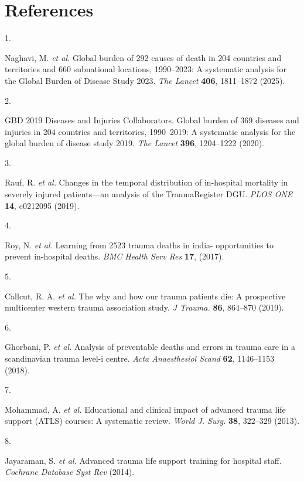\documentclass[
]{scrartcl}
\newlength{\cslhangindent}
\newlength{\csllabelwidth}
\newenvironment{CSLReferences}[2] %
 {\begin{list}{}{%
  \setlength{\itemindent}{0pt}
  \setlength{\leftmargin}{0pt}
  \setlength{\parsep}{0pt}
  \ifodd #1
   \setlength{\leftmargin}{\cslhangindent}
   \setlength{\itemindent}{-1\cslhangindent}
  \fi
  \setlength{\itemsep}{#2\baselineskip}}}
 {\end{list}}
\newcommand{\CSLLeftMargin}[1]{\parbox[t]{\csllabelwidth}{\strut#1\strut}}
\newcommand{\CSLRightInline}[1]{\parbox[t]{\linewidth - \csllabelwidth}{\strut#1\strut}}
\begin{document}
\section{References}\label{references}

\label{refs}
\begin{CSLReferences}{0}{0}
\CSLLeftMargin{1. }%
\CSLRightInline{Naghavi, M. \emph{et al.} Global burden of 292 causes of
death in 204 countries and territories and 660 subnational locations,
1990--2023: A systematic analysis for the {Global} {Burden} of {Disease}
{Study} 2023. \emph{The Lancet} \textbf{406}, 1811--1872 (2025).}

\CSLLeftMargin{2. }%
\CSLRightInline{GBD 2019 Diseases and Injuries Collaborators. Global
burden of 369 diseases and injuries in 204 countries and territories,
1990--2019: A systematic analysis for the global burden of disease study
2019. \emph{The Lancet} \textbf{396}, 1204--1222 (2020).}

\CSLLeftMargin{3. }%
\CSLRightInline{Rauf, R. \emph{et al.} Changes in the temporal
distribution of in-hospital mortality in severely injured patients---an
analysis of the TraumaRegister DGU. \emph{PLOS ONE} \textbf{14},
e0212095 (2019).}

\CSLLeftMargin{4. }%
\CSLRightInline{Roy, N. \emph{et al.} Learning from 2523 trauma deaths
in india- opportunities to prevent in-hospital deaths. \emph{BMC Health
Serv Res} \textbf{17}, (2017).}

\CSLLeftMargin{5. }%
\CSLRightInline{Callcut, R. A. \emph{et al.} The why and how our trauma
patients die: A prospective multicenter western trauma association
study. \emph{J Trauma.} \textbf{86}, 864--870 (2019).}

\CSLLeftMargin{6. }%
\CSLRightInline{Ghorbani, P. \emph{et al.} Analysis of preventable
deaths and errors in trauma care in a scandinavian trauma level-i
centre. \emph{Acta Anaesthesiol Scand} \textbf{62}, 1146--1153 (2018).}

\CSLLeftMargin{7. }%
\CSLRightInline{Mohammad, A. \emph{et al.} Educational and clinical
impact of advanced trauma life support (ATLS) courses: A systematic
review. \emph{World J. Surg.} \textbf{38}, 322--329 (2013).}

\CSLLeftMargin{8. }%
\CSLRightInline{Jayaraman, S. \emph{et al.} Advanced trauma life support
training for hospital staff. \emph{Cochrane Database Syst Rev} (2014).}


\end{CSLReferences}
\end{document}
